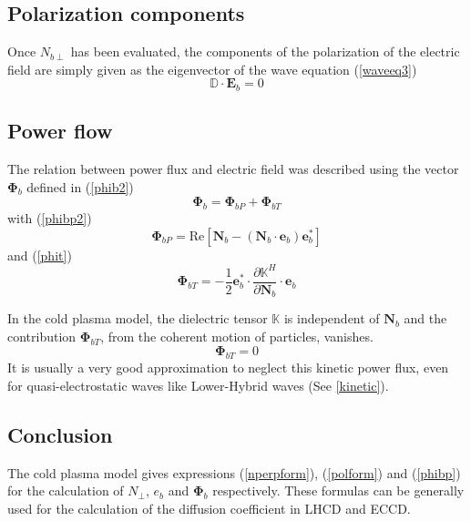 \subsection{Polarization components}

Once $N_{b\perp}$ has been evaluated, the components of the polarization of
the electric field are simply given as the eigenvector of the wave equation
(\ref{waveeq3})
\begin{equation}
\mathbb{D}\cdot\mathbf{E}_{b}=0 \label{polform}%
\end{equation}

\subsection{Power flow}

The relation between power flux and electric field was described using the
vector $\mathbf{\Phi}_{b}$ defined in (\ref{phib2})
\begin{equation}
\mathbf{\Phi}_{b}=\mathbf{\Phi}_{bP}+\mathbf{\Phi}_{bT}%
\end{equation}
with (\ref{phibp2})
\begin{equation}
\mathbf{\Phi}_{bP}=\text{Re}\left[  \mathbf{N}_{b}-\left(  \mathbf{N}_{b}%
\cdot\mathbf{e}_{b}\right)  \mathbf{e}_{b}^{\ast}\right]  \label{phibp}%
\end{equation}
and (\ref{phit})
\begin{equation}
\mathbf{\Phi}_{bT}=\mathbf{-}\frac{1}{2}\mathbf{e}_{b}^{\ast}\cdot
\frac{\partial\mathbb{K}^{H}}{\partial\mathbf{N}_{b}}\cdot\mathbf{e}_{b}%
\end{equation}

In the cold plasma model, the dielectric tensor $\mathbb{K}$ is independent of
$\mathbf{N}_{b}$ and the contribution $\mathbf{\Phi}_{bT}$, from the coherent
motion of particles, vanishes.%
\begin{equation}
\mathbf{\Phi}_{bT}=0
\end{equation}
It is usually a very good approximation to neglect this kinetic power flux,
even for quasi-electrostatic waves like Lower-Hybrid waves (See \ref{kinetic}).

\subsection{Conclusion}

The cold plasma model gives expressions (\ref{nperpform}), (\ref{polform}) and
(\ref{phibp}) for the calculation of $N_{\bot}$, $e_{b}$ and $\mathbf{\Phi
}_{b}$ respectively. These formulas can be generally used for the calculation
of the diffusion coefficient in LHCD and ECCD.

